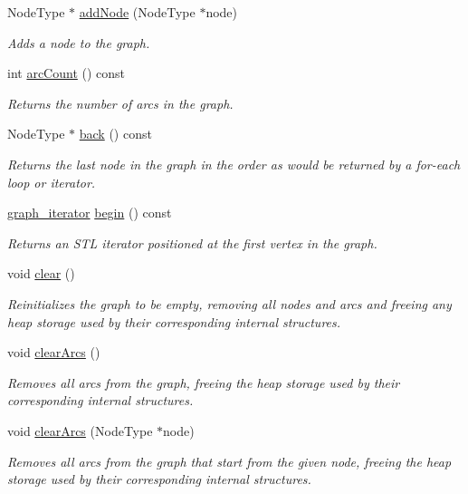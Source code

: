 \begin{DoxyCompactItemize}
Node\+Type $\ast$ \mbox{\hyperlink{classGraph_a635fa78d72315816cef6c091acfa3882}{add\+Node}} (Node\+Type $\ast$node)
\begin{DoxyCompactList}\small\item\em Adds a node to the graph. \end{DoxyCompactList}\item 
int \mbox{\hyperlink{classGraph_ac0b108b3354f5222d2c829dcd639fa7a}{arc\+Count}} () const
\begin{DoxyCompactList}\small\item\em Returns the number of arcs in the graph. \end{DoxyCompactList}\item 
Node\+Type $\ast$ \mbox{\hyperlink{classGraph_a27d59ef129bb56cc144ecc81c0affd34}{back}} () const
\begin{DoxyCompactList}\small\item\em Returns the last node in the graph in the order as would be returned by a for-\/each loop or iterator. \end{DoxyCompactList}\item 
\mbox{\hyperlink{classGraph_a695969c31e87f9e8319d74e5ca39024b}{graph\+\_\+iterator}} \mbox{\hyperlink{classGraph_aea3a8950c46f4ac913207201b685e715}{begin}} () const
\begin{DoxyCompactList}\small\item\em Returns an S\+TL iterator positioned at the first vertex in the graph. \end{DoxyCompactList}\item 
void \mbox{\hyperlink{classGraph_ac8bb3912a3ce86b15842e79d0b421204}{clear}} ()
\begin{DoxyCompactList}\small\item\em Reinitializes the graph to be empty, removing all nodes and arcs and freeing any heap storage used by their corresponding internal structures. \end{DoxyCompactList}\item 
void \mbox{\hyperlink{classGraph_a63f0ce1806df1c8070d997153363eecb}{clear\+Arcs}} ()
\begin{DoxyCompactList}\small\item\em Removes all arcs from the graph, freeing the heap storage used by their corresponding internal structures. \end{DoxyCompactList}\item 
void \mbox{\hyperlink{classGraph_a14def9e68896088fec7839e5da4fed27}{clear\+Arcs}} (Node\+Type $\ast$node)
\begin{DoxyCompactList}\small\item\em Removes all arcs from the graph that start from the given node, freeing the heap storage used by their corresponding internal structures. \end{DoxyCompactList}\item 

\end{DoxyCompactItemize}
